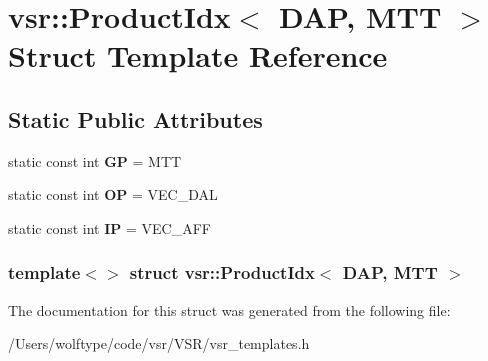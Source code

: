 \hypertarget{structvsr_1_1_product_idx_3_01_d_a_p_00_01_m_t_t_01_4}{\section{vsr\-:\-:Product\-Idx$<$ D\-A\-P, M\-T\-T $>$ Struct Template Reference}
\label{structvsr_1_1_product_idx_3_01_d_a_p_00_01_m_t_t_01_4}
}
\subsection*{Static Public Attributes}
\begin{DoxyCompactItemize}
\item 
\hypertarget{structvsr_1_1_product_idx_3_01_d_a_p_00_01_m_t_t_01_4_a01be063f36b9d82cc7435f5399c546b5}{static const int {\bfseries G\-P} = M\-T\-T}\label{structvsr_1_1_product_idx_3_01_d_a_p_00_01_m_t_t_01_4_a01be063f36b9d82cc7435f5399c546b5}

\item 
\hypertarget{structvsr_1_1_product_idx_3_01_d_a_p_00_01_m_t_t_01_4_aae3b9fccf4adc5cf82f08b8ffce97e34}{static const int {\bfseries O\-P} = V\-E\-C\-\_\-\-D\-A\-L}\label{structvsr_1_1_product_idx_3_01_d_a_p_00_01_m_t_t_01_4_aae3b9fccf4adc5cf82f08b8ffce97e34}

\item 
\hypertarget{structvsr_1_1_product_idx_3_01_d_a_p_00_01_m_t_t_01_4_a99ec5541ba5ea79f5699093092fe337e}{static const int {\bfseries I\-P} = V\-E\-C\-\_\-\-A\-F\-F}\label{structvsr_1_1_product_idx_3_01_d_a_p_00_01_m_t_t_01_4_a99ec5541ba5ea79f5699093092fe337e}

\end{DoxyCompactItemize}
\subsubsection*{template$<$$>$ struct vsr\-::\-Product\-Idx$<$ D\-A\-P, M\-T\-T $>$}



The documentation for this struct was generated from the following file\-:\begin{DoxyCompactItemize}
\item 
/\-Users/wolftype/code/vsr/\-V\-S\-R/vsr\-\_\-templates.\-h\end{DoxyCompactItemize}
